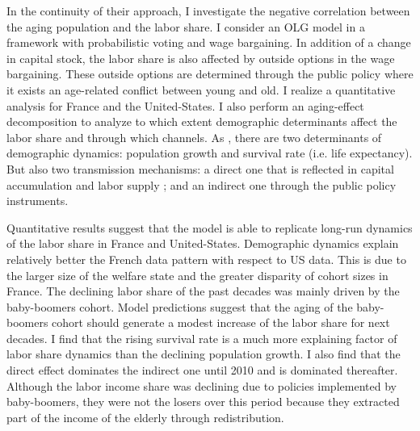 In the continuity of their approach, I investigate the negative correlation between the aging population and the labor share. I consider an OLG model in a framework with probabilistic voting and wage bargaining. In addition of a change in capital stock, the labor share is also affected by outside options in the wage bargaining. These outside options are determined through the public policy where it exists an age-related conflict between young and old. I realize a quantitative analysis for France and the United-States. I also perform an aging-effect decomposition to analyze to which extent demographic determinants affect the labor share and through which channels. As \cite{Gonzalez-Eiras2012}, there are two determinants of demographic dynamics: population growth and survival rate (i.e. life expectancy). But also two transmission mechanisms: a direct one that is reflected in capital accumulation and labor supply ; and an indirect one through the public policy instruments.

Quantitative results suggest that the model is able to replicate long-run dynamics of the labor share in France and United-States. Demographic dynamics explain relatively better the French data pattern with respect to US data. This is due to the larger size of the welfare state and the greater disparity of cohort sizes in France. 
The declining labor share of the past decades was mainly driven by the baby-boomers cohort. Model predictions suggest that the aging of the baby-boomers cohort should generate a modest increase of the labor share for next decades.
I find that the rising survival rate is a much more explaining factor of labor share dynamics than the declining population growth. I also find that the direct effect dominates the indirect one until 2010 and is dominated thereafter.
Although the labor income share was declining due to policies implemented by baby-boomers, they were not the losers over this period because they extracted part of the income of the elderly through redistribution.


